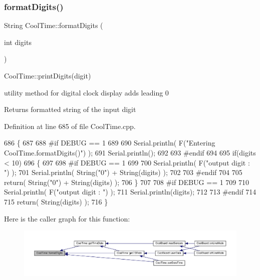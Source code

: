 \subsubsection{\texorpdfstring{format\+Digits()}{formatDigits()}}
{\footnotesize\ttfamily String Cool\+Time\+::format\+Digits (\begin{DoxyParamCaption}\item[{int}]{digits }\end{DoxyParamCaption})}

Cool\+Time\+::print\+Digits(digit)

utility method for digital clock display adds leading 0

\begin{DoxyReturn}{Returns}
formatted string of the input digit 
\end{DoxyReturn}


Definition at line 685 of file Cool\+Time.\+cpp.


\begin{DoxyCode}
686 \{
687 
688 \textcolor{preprocessor}{#if DEBUG == 1 }
689 
690     Serial.println( F(\textcolor{stringliteral}{"Entering CoolTime.formatDigits()"}) );
691     Serial.println();
692 
693 \textcolor{preprocessor}{#endif }
694 
695     \textcolor{keywordflow}{if}(digits < 10)
696     \{
697     
698 \textcolor{preprocessor}{    #if DEBUG == 1}
699 
700         Serial.println( F(\textcolor{stringliteral}{"output digit : "}) );
701         Serial.println( String(\textcolor{stringliteral}{"0"}) + String(digits) );
702 
703 \textcolor{preprocessor}{    #endif}
704 
705         \textcolor{keywordflow}{return}( String(\textcolor{stringliteral}{"0"}) + String(digits) );
706     \}
707     
708 \textcolor{preprocessor}{#if DEBUG == 1 }
709 
710     Serial.println( F(\textcolor{stringliteral}{"output digit : "}) );
711     Serial.println(digits);
712 
713 \textcolor{preprocessor}{#endif}
714 
715     \textcolor{keywordflow}{return}( String(digits) );
716 \}
\end{DoxyCode}
Here is the caller graph for this function\+:\nopagebreak
\begin{figure}[H]
\begin{center}
\leavevmode
\includegraphics[width=350pt]{d6/d49/class_cool_time_acd537cd4210d7bde4e1f5c47d2ac0456_icgraph}
\end{center}
\end{figure}
\mbox{\label{class_cool_time_ac4f32ee513c1328d984306645e8785a4}} 
